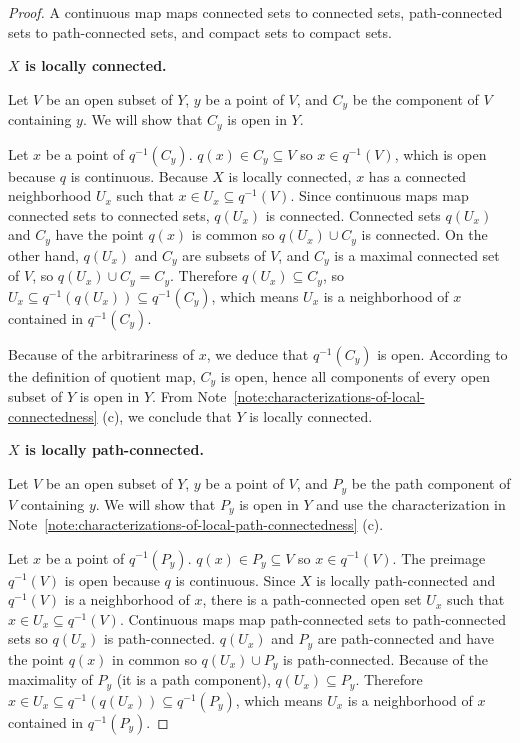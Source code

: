 \begin{proof}
	A continuous map maps connected sets to connected sets, path-connected sets to path-connected sets, and compact sets to compact sets.

	\textbf{$X$ is locally connected.}

	Let $V$ be an open subset of $Y$, $y$ be a point of $V$, and $C_{y}$ be the component of $V$ containing $y$. We will show that $C_{y}$ is open in $Y$.

	Let $x$ be a point of $q^{-1}(C_{y})$. $q(x) \in C_{y} \subseteq V$ so $x \in q^{-1}(V)$, which is open because $q$ is continuous. Because $X$ is locally connected, $x$ has a connected neighborhood $U_{x}$ such that $x\in U_{x} \subseteq q^{-1}(V)$. Since continuous maps map connected sets to connected sets, $q(U_{x})$ is connected. Connected sets $q(U_{x})$ and $C_{y}$ have the point $q(x)$ is common so $q(U_{x}) \cup C_{y}$ is connected. On the other hand, $q(U_{x})$ and $C_{y}$ are subsets of $V$, and $C_{y}$ is a maximal connected set of $V$, so $q(U_{x}) \cup C_{y} = C_{y}$. Therefore $q(U_{x}) \subseteq C_{y}$, so $U_{x} \subseteq q^{-1}(q(U_{x})) \subseteq q^{-1}(C_{y})$, which means $U_{x}$ is a neighborhood of $x$ contained in $q^{-1}(C_{y})$.

	Because of the arbitrariness of $x$, we deduce that $q^{-1}(C_{y})$ is open. According to the definition of quotient map, $C_{y}$ is open, hence all components of every open subset of $Y$ is open in $Y$. From Note~\ref{note:characterizations-of-local-connectedness} (c), we conclude that $Y$ is locally connected.

	\textbf{$X$ is locally path-connected.}

	Let $V$ be an open subset of $Y$, $y$ be a point of $V$, and $P_{y}$ be the path component of $V$ containing $y$. We will show that $P_{y}$ is open in $Y$ and use the characterization in Note~\ref{note:characterizations-of-local-path-connectedness} (c).

	Let $x$ be a point of $q^{-1}(P_{y})$. $q(x) \in P_{y} \subseteq V$ so $x \in q^{-1}(V)$. The preimage $q^{-1}(V)$ is open because $q$ is continuous. Since $X$ is locally path-connected and $q^{-1}(V)$ is a neighborhood of $x$, there is a path-connected open set $U_{x}$ such that $x \in U_{x} \subseteq q^{-1}(V)$. Continuous maps map path-connected sets to path-connected sets so $q(U_{x})$ is path-connected. $q(U_{x})$ and $P_{y}$ are path-connected and have the point $q(x)$ in common so $q(U_{x}) \cup P_{y}$ is path-connected. Because of the maximality of $P_{y}$ (it is a path component), $q(U_{x}) \subseteq P_{y}$. Therefore $x \in U_{x} \subseteq q^{-1}(q(U_{x})) \subseteq q^{-1}(P_{y})$, which means $U_{x}$ is a neighborhood of $x$ contained in $q^{-1}(P_{y})$.


\end{proof}
